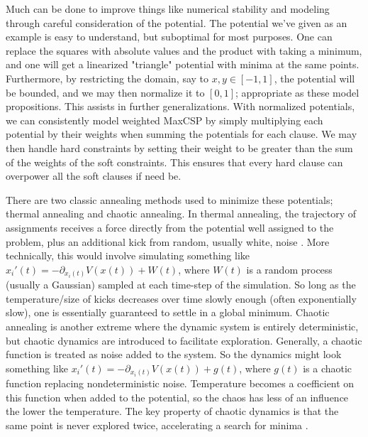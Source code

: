 Much can be done to improve things like numerical stability and modeling through careful consideration of the potential. The potential we've given as an example is easy to understand, but suboptimal for most purposes. One can replace the squares with absolute values and the product with taking a minimum, and one will get a linearized "triangle" potential with minima at the same points. Furthermore, by restricting the domain, say to $x, y \in [-1, 1]$, the potential will be bounded, and we may then normalize it to $[0, 1]$; appropriate as these model propositions. This assists in further generalizations. With normalized potentials, we can consistently model weighted MaxCSP by simply multiplying each potential by their weights when summing the potentials for each clause. We may then handle hard constraints by setting their weight to be greater than the sum of the weights of the soft constraints. This ensures that every hard clause can overpower all the soft clauses if need be.

There are two classic annealing methods used to minimize these potentials; thermal annealing and chaotic annealing. In thermal annealing, the trajectory of assignments receives a force directly from the potential well assigned to the problem, plus an additional kick from random, usually white, noise \citep{kirkpatrick1983optimization}. More technically, this would involve simulating something like $x_i'(t) = -\partial_{x_i(t)} V(x(t)) + W(t)$, where $W(t)$ is a random process (usually a Gaussian) sampled at each time-step of the simulation. So long as the temperature/size of kicks decreases over time slowly enough (often exponentially slow), one is essentially guaranteed to settle in a global minimum. Chaotic annealing is another extreme where the dynamic system is entirely deterministic, but chaotic dynamics are introduced to facilitate exploration. Generally, a chaotic function is treated as noise added to the system. So the dynamics might look something like $x_i'(t) = -\partial_{x_i(t)} V(x(t)) + g(t)$, where $g(t)$ is a chaotic function replacing nondeterministic noise. Temperature becomes a coefficient on this function when added to the potential, so the chaos has less of an influence the lower the temperature. The key property of chaotic dynamics is that the same point is never explored twice, accelerating a search for minima \citep{zhou1997chaotic}.

